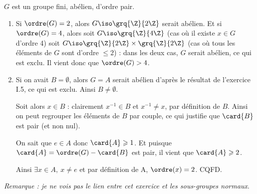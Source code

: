 $G$ est un groupe fini, abélien, d'ordre pair.

\begin{enumerate}
    \item Si $\ordre(G) = 2$, alors $G\iso \grq{\Z}{2\Z}$ serait abélien. Et si $\ordre(G) = 4$, alors soit $G\iso \grq{\Z}{4\Z}$ (cas où il existe $x\in G$ d'ordre 4) 
    soit $G\iso \grq{\Z}{2\Z}\times\grq{\Z}{2\Z}$ (cas où tous les éléments de $G$ sont d'ordre $\leqslant 2$) : dans les deux cas, $G$ serait abélien, ce qui est exclu.
    Il vient donc que $\ordre(G) > 4$.

    \item Si on avait $B=\emptyset$, alors $G=A$ serait abélien d'après le résultat de l'exercice I.5, ce qui est exclu. Ainsi $B\neq \emptyset$.
    
    Soit alors $x\in B$ : clairement $x^{-1} \in B$ et $x^{-1}\neq x$, par définition de $B$. Ainsi on peut regrouper les éléments de $B$ par couple, ce qui justifie que $\card{B}$ est pair (et non nul).

    On sait que $e\in A$ donc $ \card{A} \geqslant 1$. Et puisque $\card{A} = \ordre(G) - \card{B}$ est pair, il vient que $\card{A} \geqslant 2$.

    Ainsi $\exists x\in A,~ x\neq e$ et par définition de A, $\ordre(x) = 2$. CQFD.

\end{enumerate}

\emph{Remarque :  je ne vois pas le lien entre cet exercice et les sous-groupes normaux}.